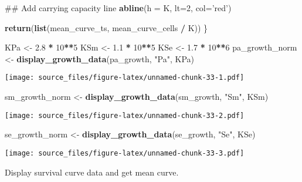 \documentclass[]{article}
\newenvironment{Shaded}{\begin{snugshade}}{\end{snugshade}}
\newcommand{\KeywordTok}[1]{\textcolor[rgb]{0.13,0.29,0.53}{\textbf{#1}}}
\newcommand{\DataTypeTok}[1]{\textcolor[rgb]{0.13,0.29,0.53}{#1}}
\newcommand{\DecValTok}[1]{\textcolor[rgb]{0.00,0.00,0.81}{#1}}
\newcommand{\FloatTok}[1]{\textcolor[rgb]{0.00,0.00,0.81}{#1}}
\newcommand{\StringTok}[1]{\textcolor[rgb]{0.31,0.60,0.02}{#1}}
\newcommand{\OperatorTok}[1]{\textcolor[rgb]{0.81,0.36,0.00}{\textbf{#1}}}
\newcommand{\NormalTok}[1]{#1}
\begin{document}
\begin{Shaded}
\begin{Highlighting}[]
\NormalTok{  ## Add carrying capacity line}
  \KeywordTok{abline}\NormalTok{(}\DataTypeTok{h =}\NormalTok{ K, }\DataTypeTok{lt=}\DecValTok{2}\NormalTok{, }\DataTypeTok{col=}\StringTok{'red'}\NormalTok{)}
  
  \KeywordTok{return}\NormalTok{(}\KeywordTok{list}\NormalTok{(mean_curve_ts, mean_curve_cells }\OperatorTok{/}\StringTok{ }\NormalTok{K))}
\NormalTok{\}}

\NormalTok{KPa <-}\StringTok{ }\FloatTok{2.8} \OperatorTok{*}\StringTok{ }\DecValTok{10}\OperatorTok{**}\DecValTok{5}
\NormalTok{KSm <-}\StringTok{ }\FloatTok{1.1} \OperatorTok{*}\StringTok{ }\DecValTok{10}\OperatorTok{**}\DecValTok{5}
\NormalTok{KSe <-}\StringTok{ }\FloatTok{1.7} \OperatorTok{*}\StringTok{ }\DecValTok{10}\OperatorTok{**}\DecValTok{6}
\NormalTok{pa_growth_norm <-}\StringTok{ }\KeywordTok{display_growth_data}\NormalTok{(pa_growth, }\StringTok{"Pa"}\NormalTok{, KPa)}
\end{Highlighting}
\end{Shaded}

\texttt{[image: source\_files/figure-latex/unnamed-chunk-33-1.pdf]}

\begin{Shaded}
\begin{Highlighting}[]
\NormalTok{sm_growth_norm <-}\StringTok{ }\KeywordTok{display_growth_data}\NormalTok{(sm_growth, }\StringTok{"Sm"}\NormalTok{, KSm)}
\end{Highlighting}
\end{Shaded}

\texttt{[image: source\_files/figure-latex/unnamed-chunk-33-2.pdf]}

\begin{Shaded}
\begin{Highlighting}[]
\NormalTok{se_growth_norm <-}\StringTok{ }\KeywordTok{display_growth_data}\NormalTok{(se_growth, }\StringTok{"Se"}\NormalTok{, KSe)}
\end{Highlighting}
\end{Shaded}

\texttt{[image: source\_files/figure-latex/unnamed-chunk-33-3.pdf]}

Display survival curve data and get mean curve.
\end{document}
